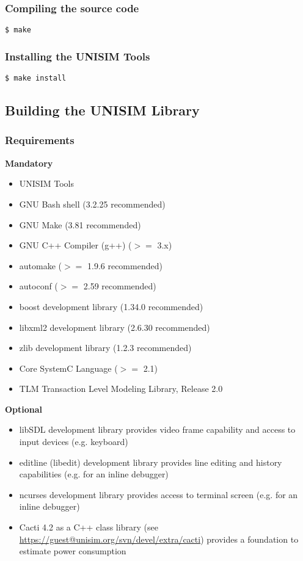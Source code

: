 \subsubsection{Compiling the source code}

\begin{verbatim}
$ make
\end{verbatim}

\subsubsection{Installing the UNISIM Tools}

\begin{verbatim}
$ make install
\end{verbatim}


\subsection{Building the UNISIM Library}

\subsubsection{Requirements}

\noindent \textbf{Mandatory}

\begin{itemize}
\item UNISIM Tools
\item GNU Bash shell (3.2.25 recommended)
\item GNU Make (3.81 recommended)
\item GNU C++ Compiler (g++) ($>=$ 3.x)
\item automake ($>=$ 1.9.6 recommended)
\item autoconf ($>=$ 2.59 recommended)
\item boost development library (1.34.0 recommended)
\item libxml2 development library (2.6.30 recommended)
\item zlib development library (1.2.3 recommended)
\item Core SystemC Language ($>=$ 2.1)
\item TLM Transaction Level Modeling Library, Release 2.0
\end{itemize}

\noindent \textbf{Optional}

\begin{itemize}
\item libSDL development library provides video frame capability and access to input devices (e.g. keyboard)
\item editline (libedit) development library provides line editing and history capabilities (e.g. for an inline debugger)
\item ncurses development library provides access to terminal screen (e.g. for an inline debugger)
\item Cacti 4.2 as a C++ class library (see \url{https://guest@unisim.org/svn/devel/extra/cacti}) provides a foundation to estimate power consumption
\end{itemize}

